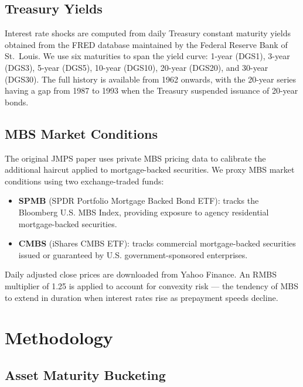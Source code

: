 \documentclass[12pt, a4paper]{article}
\begin{document}
\subsection{Treasury Yields}

Interest rate shocks are computed from daily Treasury constant maturity yields
obtained from the FRED database maintained by the Federal Reserve Bank of St.\
Louis. We use six maturities to span the yield curve: 1-year (DGS1), 3-year
(DGS3), 5-year (DGS5), 10-year (DGS10), 20-year (DGS20), and 30-year (DGS30).
The full history is available from 1962 onwards, with the 20-year series having
a gap from 1987 to 1993 when the Treasury suspended issuance of 20-year bonds.

\subsection{MBS Market Conditions}

The original JMPS paper uses private MBS pricing data to calibrate the additional
haircut applied to mortgage-backed securities. We proxy MBS market conditions
using two exchange-traded funds:

\begin{itemize}
    \item \textbf{SPMB} (SPDR Portfolio Mortgage Backed Bond ETF): tracks the
    Bloomberg U.S. MBS Index, providing exposure to agency residential
    mortgage-backed securities.
    \item \textbf{CMBS} (iShares CMBS ETF): tracks commercial mortgage-backed
    securities issued or guaranteed by U.S. government-sponsored enterprises.
\end{itemize}

Daily adjusted close prices are downloaded from Yahoo Finance. An RMBS multiplier
of 1.25 is applied to account for convexity risk --- the
tendency of MBS to extend in duration when interest rates rise as prepayment
speeds decline.

\section{Methodology}
\label{sec:method}

\subsection{Asset Maturity Bucketing}
\end{document}
